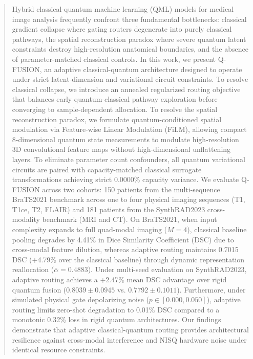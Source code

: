 \begin{abstract}
Hybrid classical-quantum machine learning (QML) models for medical image analysis frequently confront three fundamental bottlenecks: classical gradient collapse where gating routers degenerate into purely classical pathways, the spatial reconstruction paradox where severe quantum latent constraints destroy high-resolution anatomical boundaries, and the absence of parameter-matched classical controls. 
In this work, we present Q-FUSION, an adaptive classical-quantum architecture designed to operate under strict latent-dimension and variational circuit constraints. 
To resolve classical collapse, we introduce an annealed regularized routing objective that balances early quantum-classical pathway exploration before converging to sample-dependent allocation. 
To resolve the spatial reconstruction paradox, we formulate quantum-conditioned spatial modulation via Feature-wise Linear Modulation (FiLM), allowing compact 8-dimensional quantum state measurements to modulate high-resolution 3D convolutional feature maps without high-dimensional unflattening layers. 
To eliminate parameter count confounders, all quantum variational circuits are paired with capacity-matched classical surrogate transformations achieving strict 0.0000\% capacity variance.
We evaluate Q-FUSION across two cohorts: 150 patients from the multi-sequence BraTS2021 benchmark across one to four physical imaging sequences (T1, T1ce, T2, FLAIR) and 181 patients from the SynthRAD2023 cross-modality benchmark (MRI and CT). 
On BraTS2021, when input complexity expands to full quad-modal imaging ($M=4$), classical baseline pooling degrades by 4.41\% in Dice Similarity Coefficient (DSC) due to cross-modal feature dilution, whereas adaptive routing maintains 0.7015 DSC (+4.79\% over the classical baseline) through dynamic representation reallocation ($\bar{\alpha} = 0.4883$). 
Under multi-seed evaluation on SynthRAD2023, adaptive routing achieves a +2.47\% mean DSC advantage over rigid quantum fusion ($0.8039 \pm 0.0945$ vs. $0.7792 \pm 0.1011$). 
Furthermore, under simulated physical gate depolarizing noise ($p \in [0.000, 0.050]$), adaptive routing limits zero-shot degradation to 0.01\% DSC compared to a monotonic 0.32\% loss in rigid quantum architectures. 
Our findings demonstrate that adaptive classical-quantum routing provides architectural resilience against cross-modal interference and NISQ hardware noise under identical resource constraints.
\end{abstract}
